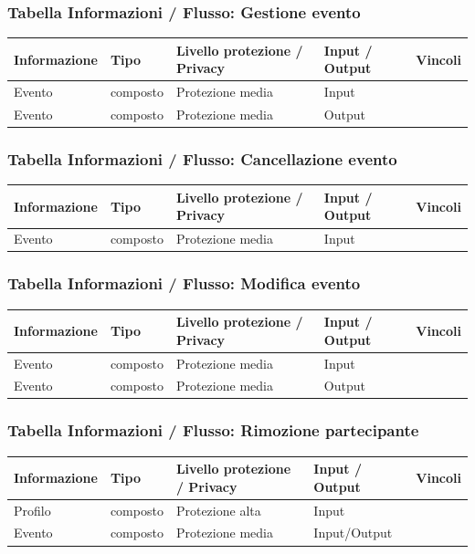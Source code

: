 \documentclass[12pt,a4paper]{report}
\begin{document}
\subsubsection{Tabella Informazioni / Flusso: Gestione evento}
\begin{tabularx}{\textwidth}{|X|X|X|X|X|}
    \hline
    \rowcolor{studyColor} \textbf{Informazione} & \textbf{Tipo} & \textbf{Livello protezione / Privacy} & \textbf{Input / Output} & \textbf{Vincoli} \\ \hline
    \endhead
    Evento & composto & Protezione media & Input & \\ \hline
    Evento & composto & Protezione media & Output & \\ \hline
\end{tabularx}

\subsubsection{Tabella Informazioni / Flusso: Cancellazione evento}
\begin{tabularx}{\textwidth}{|X|X|X|X|X|}
    \hline
    \rowcolor{studyColor} \textbf{Informazione} & \textbf{Tipo} & \textbf{Livello protezione / Privacy} & \textbf{Input / Output} & \textbf{Vincoli} \\ \hline
    \endhead
    Evento & composto & Protezione media & Input & \\ \hline
\end{tabularx}

\subsubsection{Tabella Informazioni / Flusso: Modifica evento}
\begin{tabularx}{\textwidth}{|X|X|X|X|X|}
    \hline
    \rowcolor{studyColor} \textbf{Informazione} & \textbf{Tipo} & \textbf{Livello protezione / Privacy} & \textbf{Input / Output} & \textbf{Vincoli} \\ \hline
    \endhead
    Evento & composto & Protezione media & Input & \\ \hline
    Evento & composto & Protezione media & Output & \\ \hline
\end{tabularx}

\subsubsection{Tabella Informazioni / Flusso: Rimozione partecipante}
\begin{tabularx}{\textwidth}{|X|X|X|X|X|}
    \hline
    \rowcolor{studyColor} \textbf{Informazione} & \textbf{Tipo} & \textbf{Livello protezione / Privacy} & \textbf{Input / Output} & \textbf{Vincoli} \\ \hline
    \endhead
    Profilo & composto & Protezione alta & Input & \\ \hline
    Evento & composto & Protezione media & Input/Output & \\ \hline
\end{tabularx}
\end{document}
